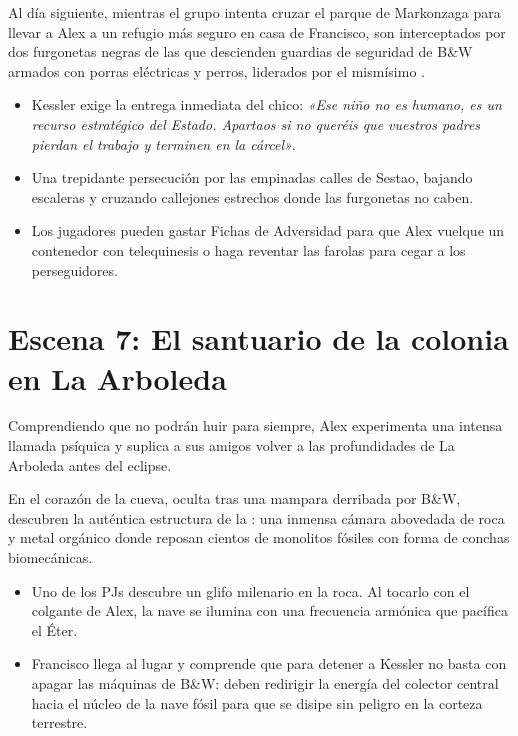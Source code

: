 
Al día siguiente, mientras el grupo intenta cruzar el parque de Markonzaga para llevar a Alex a un refugio más seguro en casa de Francisco, son interceptados por dos furgonetas negras de las que descienden guardias de seguridad de B\&W armados con porras eléctricas y perros, liderados por el mismísimo .

\begin{itemize}
  \item {} Kessler exige la entrega inmediata del chico: \emph{«Ese niño no es humano, es un recurso estratégico del Estado. Apartaos si no queréis que vuestros padres pierdan el trabajo y terminen en la cárcel»}.
  \item {} Una trepidante persecución por las empinadas calles de Sestao, bajando escaleras y cruzando callejones estrechos donde las furgonetas no caben.
  \item {} Los jugadores pueden gastar Fichas de Adversidad para que Alex vuelque un contenedor con telequinesis o haga reventar las farolas para cegar a los perseguidores.
\end{itemize}

\section{Escena 7: El santuario de la colonia en La Arboleda}


Comprendiendo que no podrán huir para siempre, Alex experimenta una intensa llamada psíquica y suplica a sus amigos volver a las profundidades de La Arboleda antes del eclipse.

En el corazón de la cueva, oculta tras una mampara derribada por B\&W, descubren la auténtica estructura de la : una inmensa cámara abovedada de roca y metal orgánico donde reposan cientos de monolitos fósiles con forma de conchas biomecánicas.
\begin{itemize}
  \item {} Uno de los PJs descubre un glifo milenario en la roca. Al tocarlo con el colgante de Alex, la nave se ilumina con una frecuencia armónica que pacífica el Éter.
  \item {} Francisco llega al lugar y comprende que para detener a Kessler no basta con apagar las máquinas de B\&W: deben redirigir la energía del colector central hacia el núcleo de la nave fósil para que se disipe sin peligro en la corteza terrestre.
\end{itemize}

